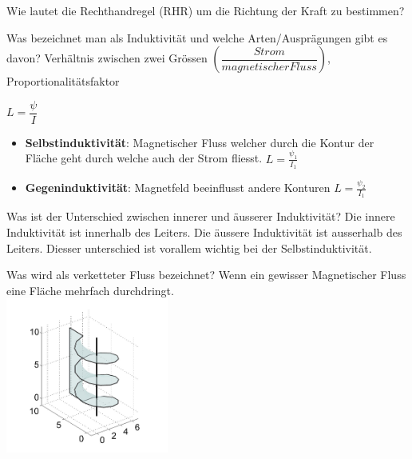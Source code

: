 \begin{karte}{Wie lautet die Rechthandregel (RHR) um die Richtung der Kraft zu bestimmen?}
\begin{karte}{Was bezeichnet man als Induktivität und welche Arten/Ausprägungen gibt es davon?}
	Verhältnis zwischen zwei Grössen $\left(\dfrac{Strom}{magnetischer Fluss}\right)$, Proportionalitätsfaktor\\[5pt]
	\begin{center}
		\begin{large}
			$L = \dfrac{\psi}{I}$\\[5pt]
		\end{large}
	\end{center}
	\begin{itemize}
		\item \textbf{Selbstinduktivität}: Magnetischer Fluss welcher durch die Kontur der Fläche geht durch welche auch der Strom fliesst. $L=\frac{\psi_1}{I_1}$
		\item \textbf{Gegeninduktivität}: Magnetfeld beeinflusst andere Konturen $L=\frac{\psi_2}{I_1}$
	\end{itemize}
\end{karte}

\begin{karte}{Was ist der Unterschied zwischen innerer und äusserer Induktivität?}
	Die innere Induktivität ist innerhalb des Leiters. Die äussere Induktivität ist ausserhalb des Leiters. Diesser unterschied ist vorallem wichtig bei der Selbstinduktivität.
\end{karte}

\begin{karte}{Was wird als verketteter Fluss bezeichnet?}
	Wenn ein gewisser Magnetischer Fluss eine Fläche mehrfach durchdringt.\\
	\center	\includegraphics[width=0.4\textwidth]{pics/MS_Verketteter_Fluss.jpg} %
\end{karte}


\end{karte}
